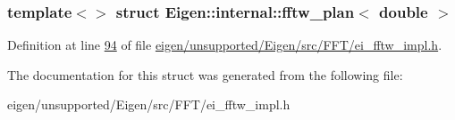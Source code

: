 \subsubsection*{template$<$$>$\newline
struct Eigen\+::internal\+::fftw\+\_\+plan$<$ double $>$}



Definition at line \hyperlink{eigen_2unsupported_2_eigen_2src_2_f_f_t_2ei__fftw__impl_8h_source_l00094}{94} of file \hyperlink{eigen_2unsupported_2_eigen_2src_2_f_f_t_2ei__fftw__impl_8h_source}{eigen/unsupported/\+Eigen/src/\+F\+F\+T/ei\+\_\+fftw\+\_\+impl.\+h}.



The documentation for this struct was generated from the following file\+:\begin{DoxyCompactItemize}
\item 
eigen/unsupported/\+Eigen/src/\+F\+F\+T/ei\+\_\+fftw\+\_\+impl.\+h\end{DoxyCompactItemize}
